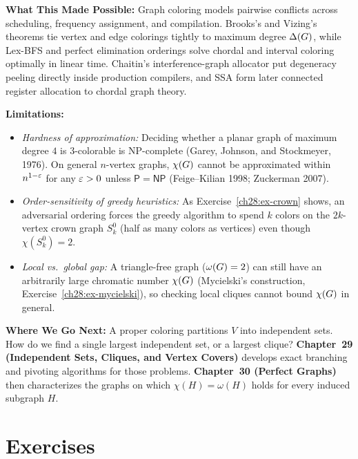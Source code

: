 \begin{connectionbox}
\textbf{What This Made Possible:}
Graph coloring models pairwise conflicts across scheduling, frequency assignment, and compilation.
Brooks's and Vizing's theorems tie vertex and edge colorings tightly to maximum degree $\Delta(G)$,
while Lex-BFS and perfect elimination orderings solve chordal and interval coloring optimally in
linear time. Chaitin's interference-graph allocator put degeneracy peeling directly inside production compilers, and SSA form later connected register allocation to chordal graph theory.

\textbf{Limitations:}
\begin{itemize}
  \item \emph{Hardness of approximation:} Deciding whether a planar graph of maximum degree $4$
        is $3$-colorable is NP-complete (Garey, Johnson, and Stockmeyer, 1976). On general $n$-vertex graphs,
        $\chi(G)$ cannot be approximated within $n^{1-\varepsilon}$ for any $\varepsilon > 0$ unless
        $\mathsf{P} = \mathsf{NP}$ (Feige--Kilian 1998; Zuckerman 2007).
  \item \emph{Order-sensitivity of greedy heuristics:} As Exercise~\ref{ch28:ex-crown} shows,
        an adversarial ordering forces the greedy algorithm to spend $k$ colors on the $2k$-vertex crown graph $S_k^0$ (half as many colors as vertices) even though $\chi(S_k^0) = 2$.
  \item \emph{Local vs.\ global gap:} A triangle-free graph ($\omega(G) = 2$) can still
        have an arbitrarily large chromatic number $\chi(G)$ (Mycielski's construction, Exercise~\ref{ch28:ex-mycielski}),
        so checking local cliques cannot bound $\chi(G)$ in general.
\end{itemize}

\textbf{Where We Go Next:}
A proper coloring partitions $V$ into independent sets. How do we find a single
largest independent set, or a largest clique? \textbf{Chapter~29
(Independent Sets, Cliques, and Vertex Covers)} develops exact branching and pivoting algorithms for those problems.
\textbf{Chapter~30 (Perfect Graphs)} then characterizes the graphs on which $\chi(H)=\omega(H)$ holds for every induced subgraph $H$.
\end{connectionbox}

\section{Exercises}
\label{ch28:exercises}

